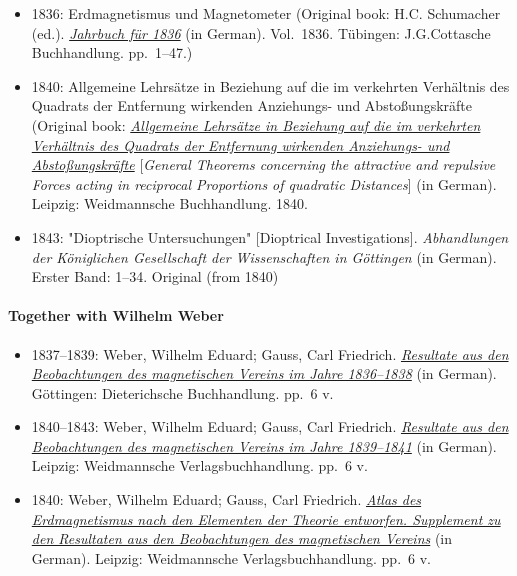 \begin{itemize}
  \begin{itemize}
  \tightlist
  \item
    {\href{http://21sci-tech.com/translations/gaussMagnetic.pdf}{The Intensity of the Earth\textquotesingle s Magnetic Force Reduced to Absolute Measurement.} Translated by Susan P. Johnson.}
  \end{itemize}
\item
  {1836: Erdmagnetismus und Magnetometer (Original book: H.C. Schumacher (ed.). \href{https://www.digitale-sammlungen.de/de/view/bsb10538569?page=21}{\emph{Jahrbuch für 1836}} (in German). Vol.{~}1836. Tübingen: J.G.Cotta\textquotesingle sche Buchhandlung. pp.{~}{1--}47.{})}
\item
  {1840: Allgemeine Lehrsätze in Beziehung auf die im verkehrten Verhältnis des Quadrats der Entfernung wirkenden Anziehungs- und Abstoßungskräfte (Original book: \href{https://www.deutschestextarchiv.de/book/show/gauss_lehrsaetze_1840}{\emph{Allgemeine Lehrsätze in Beziehung auf die im verkehrten Verhältnis des Quadrats der Entfernung wirkenden Anziehungs- und Abstoßungskräfte}} {{[}}\emph{General Theorems concerning the attractive and repulsive Forces acting in reciprocal Proportions of quadratic Distances}{{]}} (in German). Leipzig: Weidmannsche Buchhandlung. 1840.{}}
\item
  {1843: "Dioptrische Untersuchungen" {{[}}Dioptrical Investigations{{]}}. \emph{Abhandlungen der Königlichen Gesellschaft der Wissenschaften in Göttingen} (in German). Erster Band: {1--}34.{} Original (from 1840)}
\end{itemize}


\paragraph{Together with Wilhelm Weber}\label{Together_with_Wilhelm_Weber}

\begin{itemize}
\tightlist
\item
  {1837--1839: Weber, Wilhelm Eduard; Gauss, Carl Friedrich. \href{https://babel.hathitrust.org/cgi/pt?id=njp.32101058086446&view=1up&seq=9}{\emph{Resultate aus den Beobachtungen des magnetischen Vereins im Jahre 1836--1838}} (in German). Göttingen: Dieterichsche Buchhandlung. pp.{~}6 v.{}}
\item
  {1840--1843: Weber, Wilhelm Eduard; Gauss, Carl Friedrich. \href{https://babel.hathitrust.org/cgi/pt?id=njp.32101058086396&view=1up&seq=199}{\emph{Resultate aus den Beobachtungen des magnetischen Vereins im Jahre 1839--1841}} (in German). Leipzig: Weidmannsche Verlagsbuchhandlung. pp.{~}6 v.{}}
\item
  {1840: Weber, Wilhelm Eduard; Gauss, Carl Friedrich. \href{https://babel.hathitrust.org/cgi/pt?id=njp.32101058086388&view=1up&seq=5}{\emph{Atlas des Erdmagnetismus nach den Elementen der Theorie entworfen. Supplement zu den Resultaten aus den Beobachtungen des magnetischen Vereins}} (in German). Leipzig: Weidmannsche Verlagsbuchhandlung. pp.{~}6 v.{}}
\end{itemize}


